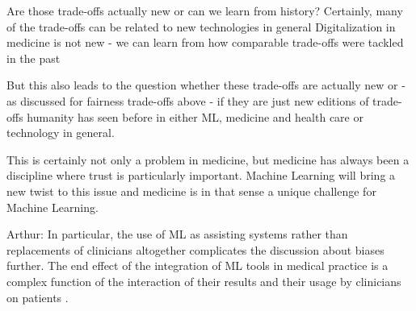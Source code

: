 Are those trade-offs actually new or can we learn from history?
Certainly, many of the trade-offs can be related to new technologies in general \cite{Williamson2021}
Digitalization in medicine is not new - we can learn from how comparable trade-offs were tackled in the past \cite{sutton2020overview}


But this also leads to the question whether these trade-offs are actually new or - as discussed for fairness trade-offs above - if they are just new editions of trade-offs humanity has seen before in either ML, medicine and health care or technology in general.

This is certainly not only a problem in medicine, but medicine has always been a discipline where trust is particularly important. Machine Learning will bring a new twist to this issue and medicine is in that sense a unique challenge for Machine Learning.



Arthur:
In particular, the use of ML as assisting systems rather than replacements of clinicians altogether complicates the discussion about biases further.
The end effect of the integration of ML tools in medical practice is a complex function of the interaction of their results and their usage by clinicians on patients \cite[p.~4]{Rajkomar2018}.